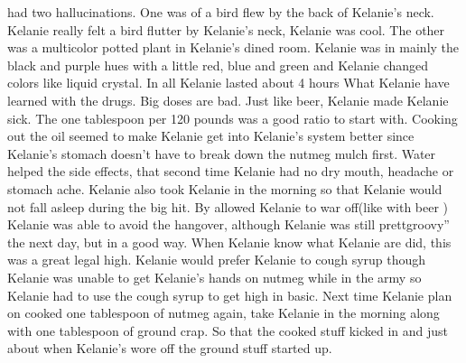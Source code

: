 \documentclass[12pt]{book}
\begin{document}
had two hallucinations. One was of a bird flew by the back of Kelanie's neck. Kelanie really felt a bird flutter by Kelanie's neck, Kelanie was cool. The other was a multicolor potted plant in Kelanie's dined room. Kelanie was in mainly the black and purple hues with a little red, blue and green and Kelanie changed colors like liquid crystal. In all Kelanie lasted about 4 hours What Kelanie have learned with the drugs. Big doses are bad. Just like beer, Kelanie made Kelanie sick. The one tablespoon per 120 pounds was a good ratio to start with. Cooking out the oil seemed to make Kelanie get into Kelanie's system better since Kelanie's stomach doesn't have to break down the nutmeg mulch first. Water helped the side effects, that second time Kelanie had no dry mouth, headache or stomach ache. Kelanie also took Kelanie in the morning so that Kelanie would not fall asleep during the big hit. By allowed Kelanie to war off(like with beer ) Kelanie was able to avoid the hangover, although Kelanie was still prettgroovy'' the next day, but in a good way. When Kelanie know what Kelanie are did, this was a great legal high. Kelanie would prefer Kelanie to cough syrup though Kelanie was unable to get Kelanie's hands on nutmeg while in the army so Kelanie had to use the cough syrup to get high in basic. Next time Kelanie plan on cooked one tablespoon of nutmeg again, take Kelanie in the morning along with one tablespoon of ground crap. So that the cooked stuff kicked in and just about when Kelanie's wore off the ground stuff started up.
\end{document}
